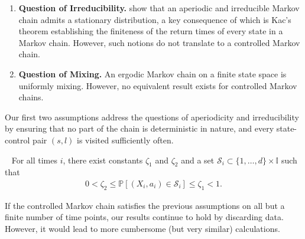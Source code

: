 \documentclass[opre,sglanonrev]{informs4}
\numberwithin{equation}{section}
\newcommand{\pow}[1]{^{(#1)}}
\newcommand{\Ibb}{\mathbb{I}}
\newcommand{\Pbb}{\mathbb{P}}
\newcommand{\statespace}{\{1,\dots, d\}}
\newcommand{\prob}{\Pbb}
\begin{document}
{\begin{enumerate}
\begin{small}
\begin{align*}
\begin{bmatrix}
        \end{bmatrix}.
    \end{align*}        
    \end{small}
    It can be verified easily that each of the transition probability matrices is aperiodic (and, in fact, ergodic). However, consider a time-inhomogenous Markov chain on state-space $\{1,2,3\}$ where the transition matrices arrive in a sequence $(M\pow{1},M\pow{2},M\pow{3},M\pow{1},M\pow{2},M\pow{3},\dots)$. Not only is it periodic if the initial state is $1$, {it is guaranteed to eventually become periodic.}
    \item \textbf{Question of Irreducibility.} %
    \cite[Theorem 13.0.1]{meyntweedie} show that an aperiodic and irreducible Markov chain admits a stationary distribution, %
    a key consequence of which is Kac's theorem \citep[Theorem 10.2.2]{meyntweedie} establishing the finiteness of the return times of every state in a Markov chain. However, such notions do not translate to a controlled Markov chain. 
    \item \textbf{Question of Mixing.} %
    An ergodic Markov chain on a finite state space is uniformly mixing. However, no equivalent result exists for controlled Markov chains. %
\end{enumerate}
Our first two assumptions address the questions of aperiodicity and irreducibility by ensuring that no part of the chain is deterministic in nature, and every state-control pair $(s,l)$ is visited sufficiently often. 
\begin{assumption}~\label{assume:sets}
For all times $i$, there exist constants $\zeta_1$ and $\zeta_2$ %
and a set $\mathcal{S}_i\subset \statespace\times\Ibb$ such that \begin{align*}
    0 < \zeta_2\leq \prob[(X_i,a_i)\in \mathcal{S}_i]\leq\zeta_1 < 1.
\end{align*}
\end{assumption}
{\color{black}\begin{remark}
If the controlled Markov chain satisfies the previous assumptions on all but a finite number of time points, our results continue to hold by discarding data.
However, it would lead to more cumbersome (but very similar) calculations. 
\end{remark}
}

}
\end{document}
